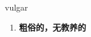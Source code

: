 
\begin{frame}
{\huge vulgar}
\begin{center}
\begin{enumerate}\Large
  \item \textbf{粗俗的，无教养的}
\end{enumerate}
\end{center}
\end{frame}

